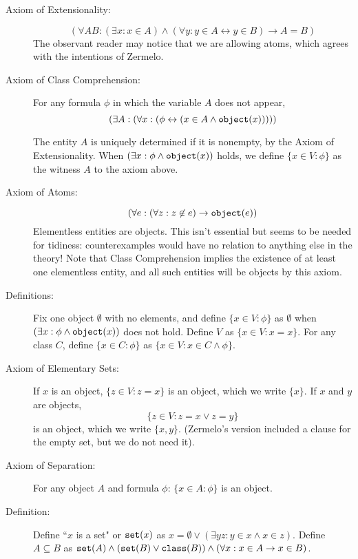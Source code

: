 \documentclass[12pt]{article}
\begin{document}
\begin{description}

\item[Axiom of Extensionality:]  $$(\forall AB: (\exists x:x \in A) \wedge (\forall y:y \in A \leftrightarrow y \in B) \rightarrow A=B)$$  The observant reader may notice that we are allowing atoms, which agrees with the intentions of Zermelo.

\item[Axiom of Class Comprehension:]  For any formula $\phi$ in which the variable $A$ does not appear, $$(\exists A:(\forall x:(\phi \leftrightarrow (x\in A \wedge {\tt object}(x)))))$$

The entity $A$ is uniquely determined if it is nonempty, by the Axiom of Extensionality.   When $(\exists x:\phi \wedge {\tt object}(x))$ holds, we define $\{x \in V:\phi\}$ as the witness $A$ to the axiom above.

\item[Axiom of Atoms:]  $$(\forall e:(\forall z:z \not\in e) \rightarrow {\tt object}(e))$$  Elementless entities are objects.  This isn't essential but seems to be needed for tidiness:  counterexamples would have no relation to anything else in the theory!   Note that Class Comprehension implies the existence of at least one elementless entity, and all such entities will be objects by this axiom.

\item[Definitions:]  Fix one object $\emptyset$ with no elements, and define $\{x \in V:\phi\}$ as $\emptyset$ when  $(\exists x:\phi \wedge {\tt object}(x))$ does not hold.  Define $V$ as $\{x\in V:x=x\}$.  For any class $C$, define $\{x \in C:\phi\}$ as $\{x \in V:x \in C \wedge \phi\}$.

\item[Axiom of Elementary Sets:]  If $x$ is an object, $\{z \in V:z=x\}$ is an object, which we write $\{x\}$.   If $x$ and $y$ are objects, $$\{z\in V:z=x \vee z=y\}$$ is an object, which we write $\{x,y\}$.  (Zermelo's version included a clause for the empty set, but we do not need it).

\item[Axiom of Separation:]  For any object $A$ and formula $\phi$: $\{x \in A:\phi\}$ is an object.

\item[Definition:] Define ``$x$ is a set" or ${\tt set}(x)$ as $x=\emptyset \vee (\exists yz:y \in x \wedge x \in z)$.  Define $A \subseteq B$ as ${\tt set}(A) \wedge ({\tt set}(B) \vee {\tt class}(B)) \wedge (\forall x:x \in A \rightarrow x \in B)$.


\end{description}
\end{document}
